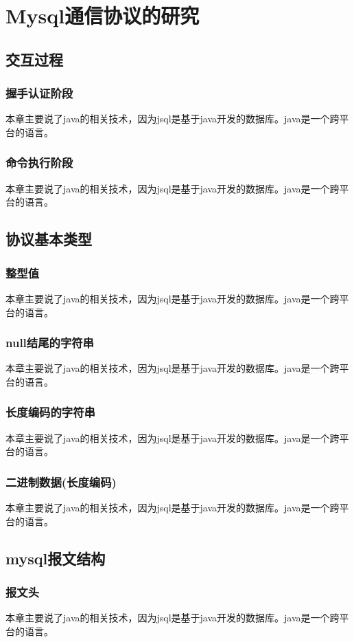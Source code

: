 
\chapter{Mysql通信协议的研究}
\section{交互过程}
\subsection{握手认证阶段}
本章主要说了java的相关技术，因为jsql是基于java开发的数据库。java是一个跨平台的语言。
\subsection{命令执行阶段}
本章主要说了java的相关技术，因为jsql是基于java开发的数据库。java是一个跨平台的语言。

\section{协议基本类型}
\subsection{整型值}
本章主要说了java的相关技术，因为jsql是基于java开发的数据库。java是一个跨平台的语言。
\subsection{null结尾的字符串}
本章主要说了java的相关技术，因为jsql是基于java开发的数据库。java是一个跨平台的语言。
\subsection{长度编码的字符串}
本章主要说了java的相关技术，因为jsql是基于java开发的数据库。java是一个跨平台的语言。
\subsection{二进制数据(长度编码)}
本章主要说了java的相关技术，因为jsql是基于java开发的数据库。java是一个跨平台的语言。

\section{mysql报文结构}
\subsection{报文头}
本章主要说了java的相关技术，因为jsql是基于java开发的数据库。java是一个跨平台的语言。
